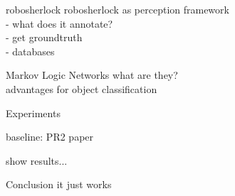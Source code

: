 \documentclass[]{beamer}
\begin{document}
\begin{frame}{robosherlock}
robosherlock as perception framework\\
- what does it annotate?\\
- get groundtruth\\
- databases 
\end{frame}


\begin{frame}{Markov Logic Networks}
what are they?\\
advantages for object classification
\end{frame}

\begin{frame}{Experiments}

baseline: PR2 paper

show results...

\end{frame}


\begin{frame}{Conclusion}
it just works
\end{frame}
\end{document}
